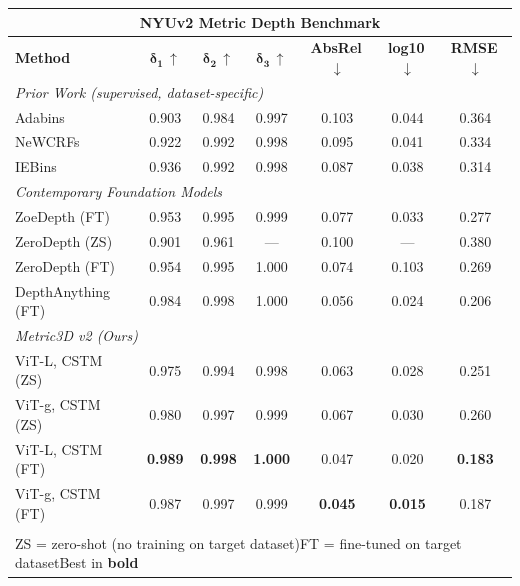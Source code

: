 \documentclass[border=10pt]{standalone}
\begin{document}
\begin{tabular}{@{} l c c c c c c @{}}
\toprule
\multicolumn{7}{c}{\textbf{\color{garnet}\textsf{\large NYUv2 Metric Depth Benchmark}}} \\[4pt]
\midrule
\textsf{\textbf{Method}} & \textsf{$\boldsymbol{\delta_1}$\,$\uparrow$} & \textsf{$\boldsymbol{\delta_2}$\,$\uparrow$} & \textsf{$\boldsymbol{\delta_3}$\,$\uparrow$} & \textsf{\textbf{AbsRel}\,$\downarrow$} & \textsf{\textbf{log10}\,$\downarrow$} & \textsf{\textbf{RMSE}\,$\downarrow$} \\
\midrule
\multicolumn{7}{l}{\textit{\color{bk90}\textsf{Prior Work (supervised, dataset-specific)}}} \\[2pt]
\textsf{Adabins}           & 0.903 & 0.984 & 0.997 & 0.103 & 0.044 & 0.364 \\
\textsf{NeWCRFs}            & 0.922 & 0.992 & 0.998 & 0.095 & 0.041 & 0.334 \\
\textsf{IEBins}             & 0.936 & 0.992 & 0.998 & 0.087 & 0.038 & 0.314 \\
\midrule
\multicolumn{7}{l}{\textit{\color{bk90}\textsf{Contemporary Foundation Models}}} \\[2pt]
\textsf{ZoeDepth (FT)}      & 0.953 & 0.995 & 0.999 & 0.077 & 0.033 & 0.277 \\
\textsf{ZeroDepth (ZS)}     & 0.901 & 0.961 & ---   & 0.100 & ---   & 0.380 \\
\textsf{ZeroDepth (FT)}     & 0.954 & 0.995 & 1.000 & 0.074 & 0.103 & 0.269 \\
\textsf{DepthAnything (FT)} & 0.984 & 0.998 & 1.000 & 0.056 & 0.024 & 0.206 \\
\midrule
\multicolumn{7}{l}{\textit{\color{garnet}\textsf{Metric3D v2 (Ours)}}} \\[2pt]
\rowcolor{highlight} \textsf{ViT-L, CSTM (ZS)}  & 0.975 & 0.994 & 0.998 & 0.063 & 0.028 & 0.251 \\
\rowcolor{highlight} \textsf{ViT-g, CSTM (ZS)}  & 0.980 & 0.997 & 0.999 & 0.067 & 0.030 & 0.260 \\
\rowcolor{highlight} \textsf{ViT-L, CSTM (FT)}  & \textbf{0.989} & \textbf{0.998} & \textbf{1.000} & 0.047 & 0.020 & \textbf{0.183} \\
\rowcolor{highlight} \textsf{ViT-g, CSTM (FT)}  & 0.987 & 0.997 & 0.999 & \textbf{0.045} & \textbf{0.015} & 0.187 \\
\bottomrule
\\[-4pt]
\multicolumn{7}{l}{\scriptsize\textsf{ZS = zero-shot (no training on target dataset)\quad FT = fine-tuned on target dataset\quad Best in \textbf{bold}}} \\
\end{tabular}
\end{document}
